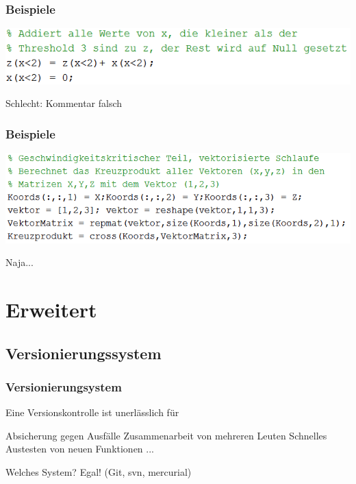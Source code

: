 \documentclass{beamer}
\begin{document}
\begin{frame}
    \frametitle{Beispiele}
        \begin{center}
    \includegraphics[width=\textwidth]{pictures/Kommentare5.PNG}

    \pause
    \vspace{2em}
            \huge \color{red} Schlecht: Kommentar falsch
        \end{center}
\end{frame}
\begin{frame}
    \frametitle{Beispiele}
        \begin{center}
    \includegraphics[width=\textwidth]{pictures/Kommentare1.PNG}

    \pause
    \vspace{2em}
            \huge \color{orange} Naja...
        \end{center}
\end{frame}


\section{Erweitert}
\begin{frame}
    \tableofcontents[currentsection]
\end{frame}
\subsection{Versionierungssystem}
\begin{frame}
    \frametitle{Versionierungsystem}

    Eine Versionskontrolle ist unerlässlich für
    \begin{outline}
        \1 Absicherung gegen Ausfälle
        \1 Zusammenarbeit von mehreren Leuten
        \1 Schnelles Austesten von neuen Funktionen
        \1 ...
    \end{outline} \pause

    \vspace{2em}Welches System?\hspace{3em}
    \pause 
    Egal! (Git, svn, mercurial)

    \vspace{1em}
\end{frame}
\end{document}
